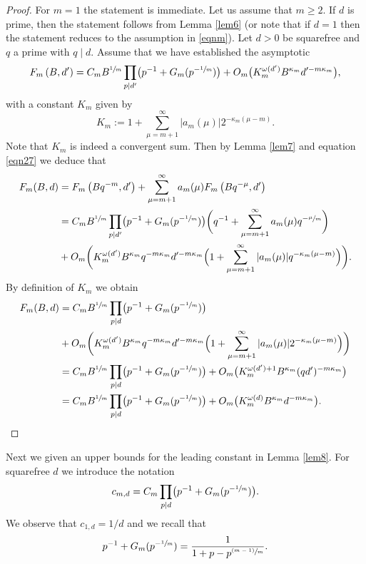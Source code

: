 \documentclass[11pt]{article}
\numberwithin{equation}{section}
\newcommand{\psfrac}[2]{\sfrac{(#1)}{#2}}
\let\kap\kappa
\let\ome\omega
\theoremstyle{definition}
\numberwithin{theorem}{section}
\begin{document}
\begin{proof}
For $m=1$ the statement is immediate. Let us assume that $m\geq 2$.
If $d$ is prime, then the statement follows from Lemma \ref{lem6} (or note that if $d=1$ then the statement reduces to the assumption in \eqref{eqnm}). Let $d>0$ be squarefree and $q$ a prime with $q\mid d$. Assume that we have established the asymptotic
\[
F_m\left(B,d'\right)=C_mB^{\sfrac{1}{m}}\prod_{p\mid d'} \bigl(p^{-1}+G_m(p^{-\sfrac{1}{m}})\bigr)+ O_m\bigl(K_m^{\ome(d')}B^{\kap_m}d'^{-m\kap_m}\bigr),
\]
with a constant $K_m$ given by
\[
K_m:= 1+\sum_{\mu=m+1}^{\infty}|a_m(\mu)| 2^{-\kap_m(\mu-m)}.
\]
Note that $K_m$ is indeed a convergent sum. Then by Lemma \ref{lem7} and equation \eqref{eqn27} we deduce that
\begin{equation*}
\begin{split}
F_m(B,d)&= F_m\left(Bq^{-m},d'\right) +\sum_{\mu=m+1}^\infty a_m(\mu) F_m\left(Bq^{-\mu},d'\right)\\
&=C_mB^{\sfrac{1}{m}}\prod_{p\mid d'} \bigl(p^{-1}+G_m(p^{-\sfrac{1}{m}})\bigl)\biggl(q^{-1}+\sum_{\mu=m+1}^\infty a_m(\mu) q^{-\sfrac{\mu}{m}}\biggr)\\
&+ O_m\biggl(K_m^{\ome(d')}B^{\kap_m}q^{-m\kap_m}d'^{-m\kap_m}\Bigl(1+\sum_{\mu=m+1}^{\infty}|a_m(\mu)| q^{-\kap_m(\mu-m)}\Bigr)\biggr).
\end{split}
\end{equation*}
By definition of $K_m$ we obtain
\begin{equation*}
\begin{split}
F_m(B,d)&=C_mB^{\sfrac{1}{m}}\prod_{p\mid d} \bigl(p^{-1}+G_m(p^{-\sfrac{1}{m}})\bigr)\\ &+ O_m\biggl(K_m^{\ome(d')}B^{\kap_m}q^{-m\kap_m}d'^{-m\kap_m}\Bigl(1+\sum_{\mu=m+1}^{\infty}|a_m(\mu)| 2^{-\kap_m(\mu-m)}\Bigr)\biggr)\\
&=C_mB^{\sfrac{1}{m}}\prod_{p\mid d} \bigl(p^{-1}+G_m(p^{-\sfrac{1}{m}})\bigr)+ O_m\bigl(K_m^{\ome(d')+1}B^{\kap_m}(qd')^{-m\kap_m}\bigr)\\
&= C_mB^{\sfrac{1}{m}}\prod_{p\mid d} \bigl(p^{-1}+G_m(p^{-\sfrac{1}{m}})\bigr)+ O_m\bigl(K_m^{\ome(d)}B^{\kap_m}d^{-m\kap_m}\bigr).
\qedhere
\end{split}
\end{equation*}
\end{proof}

Next we given an upper bounds for the leading constant in Lemma \ref{lem8}. For squarefree $d$ we introduce the notation
\begin{equation}
\label{eq:c_md_explicit}
c_{m,d}=C_m\prod_{p\mid d}\bigl(p^{-1}+G_m(p^{-\sfrac{1}{m}})\bigr).
\end{equation}
We observe that $c_{1,d}=1/d$ and we recall that
\begin{equation}\label{eqn10}
p^{-1}+G_{m}(p^{-\sfrac{1}{m}})=\frac1{1+p-p^{\psfrac{m-1}{m}}}.
\end{equation}
\end{document}
